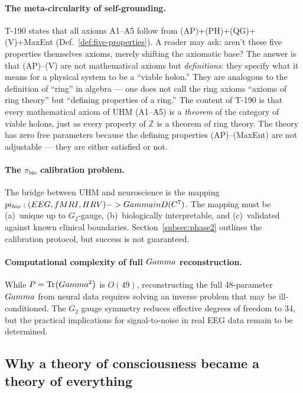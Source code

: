 \paragraph{The meta-circularity of self-grounding.}
T-190 states that all axioms A1--A5 follow from (AP)+(PH)+(QG)+(V)+MaxEnt
(Def.~\ref{def:five-properties}). A reader may ask: aren't these five
properties themselves axioms, merely shifting the axiomatic base? The
answer is that (AP)--(V) are not mathematical axioms but \emph{definitions}:
they specify what it means for a physical system to be a ``viable holon.''
They are analogous to the definition of ``ring'' in algebra ---
one does not call the ring axioms ``axioms of ring theory'' but
``defining properties of a ring.'' The content of T-190 is that every
mathematical axiom of UHM (A1--A5) is a \emph{theorem} of the category
of viable holons, just as every property of $\mathbb{Z}$ is a theorem
of ring theory. The theory has zero free parameters because the
defining properties (AP)--(MaxEnt) are not adjustable --- they are
either satisfied or not.

\paragraph{The $\pi_{\mathrm{bio}}$ calibration problem.}
The bridge between UHM and neuroscience is the mapping
$pi_{bio}: (EEG, fMRI, HRV) -> Gamma in
D(C^7)$. The mapping must be (a)~unique up to $G_2$-gauge, (b)~biologically
interpretable, and (c)~validated against known clinical boundaries.
Section~\ref{subsec:phase2} outlines the calibration protocol, but success is not
guaranteed.

\paragraph{Computational complexity of full $Gamma$ reconstruction.}
While $P = \Tr(Gamma^2)$ is $O(49)$, reconstructing the full 48-parameter $Gamma$ from
neural data requires solving an inverse problem that may be ill-conditioned. The $G_2$
gauge symmetry reduces effective degrees of freedom to 34, but the practical implications
for signal-to-noise in real EEG data remain to be determined.

\subsection{Why a theory of consciousness became a theory of everything}

